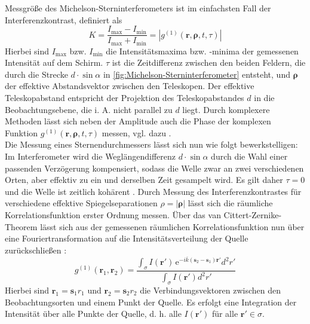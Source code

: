 Messgröße des Michelson-Sterninterferometers ist im einfachsten Fall der Interferenzkontrast, definiert als \cite{foellmiIntensityInterferometrySecondorder2009}
\begin{equation}
    K = \frac{I_{\mathrm{max}}-I_{\mathrm{min}}}{I_{\mathrm{max}}+I_{\mathrm{min}}}=\left|g^{(1)}(\mathbf{r}, \bm{\rho}, t, \tau)\right|
\end{equation} 
Hierbei sind $I_{\mathrm{max}}$ bzw. $I_{\mathrm{min}}$ die Intensitätsmaxima bzw. -minima der gemessenen Intensität auf dem Schirm. 
$\tau$ ist die Zeitdifferenz zwischen den beiden Feldern, die durch die Strecke $d\cdot\sin \alpha$ in \autoref{fig:Michelson-Sterninterferometer} entsteht, und $\bm{\rho}$ der effektive Abstandsvektor zwischen den Teleskopen. 
Der effektive Teleskopabstand entspricht der Projektion des Teleskopabstandes $d$ in die Beobachtungsebene, die i. A. nicht parallel zu $d$ liegt. 
Durch komplexere Methoden lässt sich neben der Amplitude auch die Phase der komplexen Funktion $g^{(1)}(\mathbf{r}, \bm{\rho}, t, \tau)$ messen, vgl. dazu \cite[Kap. 4.3]{mandelOpticalCoherenceQuantum1995}. \\
Die Messung eines Sternendurchmessers lässt sich nun wie folgt bewerkstelligen:
Im Interferometer wird die Weglängendifferenz $d \cdot\sin \alpha$ durch die Wahl einer passenden Verzögerung kompensiert, sodass die Welle zwar an zwei verschiedenen Orten, aber effektiv zu ein und derselben Zeit gesampelt wird. 
Es gilt daher $\tau=0$ und die Welle ist zeitlich kohärent \cite{foellmiIntensityInterferometrySecondorder2009}. 
Durch Messung des Interferenzkontrastes für verschiedene effektive Spiegelseparationen $\rho=|\bm{\rho}|$ lässt sich die räumliche Korrelationsfunktion erster Ordnung messen. 
Über das van Cittert-Zernike-Theorem lässt sich aus der gemessenen räumlichen Korrelationsfunktion nun über eine Fouriertransformation auf die Intensitätsverteilung der Quelle zurückschließen \cite[Gl. 4.4-40]{mandelOpticalCoherenceQuantum1995}:
\begin{equation}
    g^{(1)}(\bm{r}_1, \bm{r}_2) = \frac{\int_\sigma I(\bm{r}') \,\mathrm{e}^{-i\overline{k}\left(\bm{s}_2 - \bm{s}_1\right) \bm{r}'} d^2r'}{\int_\sigma I \left(\bm{r}'\right) d^2 r'}
    \label{eq:van Cittert-Zernike}
\end{equation}
Hierbei sind $\bm{r}_1=\bm{s}_1 r_1$ und $\bm{r}_2=\bm{s}_2 r_2$ die Verbindungsvektoren zwischen den Beobachtungsorten und einem Punkt der Quelle. 
Es erfolgt eine Integration der Intensität über alle Punkte der Quelle, d. h. alle $I\left(\bm{r}'\right)$ für alle $\bm{r}'\in \sigma$. 
